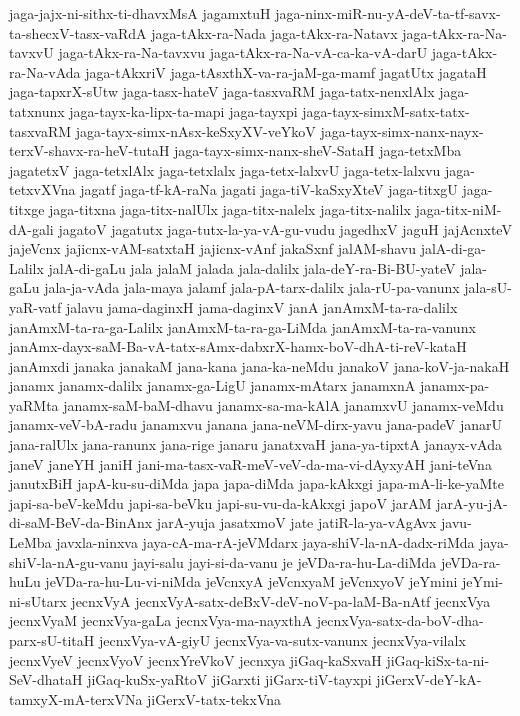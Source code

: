 {jaga-jajx-ni-sithx-ti-dhavxMsA
jagamxtuH
jaga-ninx-miR-nu-yA-deV-ta-tf-savx-ta-shecxV-tasx-vaRdA
jaga-tAkx-ra-Nada
jaga-tAkx-ra-Natavx
jaga-tAkx-ra-Na-tavxvU
jaga-tAkx-ra-Na-tavxvu
jaga-tAkx-ra-Na-vA-ca-ka-vA-darU
jaga-tAkx-ra-Na-vAda
jaga-tAkxriV
jaga-tAsxthX-va-ra-jaM-ga-mamf
jagatUtx
jagataH
jaga-tapxrX-sUtw
jaga-tasx-hateV
jaga-tasxvaRM
jaga-tatx-nenxlAlx
jaga-tatxnunx
jaga-tayx-ka-lipx-ta-mapi
jaga-tayxpi
jaga-tayx-simxM-satx-tatx-tasxvaRM
jaga-tayx-simx-nAsx-keSxyXV-veYkoV
jaga-tayx-simx-nanx-nayx-terxV-shavx-ra-heV-tutaH
jaga-tayx-simx-nanx-sheV-SataH
jaga-tetxMba
jagatetxV
jaga-tetxlAlx
jaga-tetxlalx
jaga-tetx-lalxvU
jaga-tetx-lalxvu
jaga-tetxvXVna
jagatf
jaga-tf-kA-raNa
jagati
jaga-tiV-kaSxyXteV
jaga-titxgU
jaga-titxge
jaga-titxna
jaga-titx-nalUlx
jaga-titx-nalelx
jaga-titx-nalilx
jaga-titx-niM-dA-gali
jagatoV
jagatutx
jaga-tutx-la-ya-vA-gu-vudu
jagedhxV
jaguH
jajAcnxteV
jajeVcnx
jajicnx-vAM-satxtaH
jajicnx-vAnf
jakaSxnf
jalAM-shavu
jalA-di-ga-Lalilx
jalA-di-gaLu
jala
jalaM
jalada
jala-dalilx
jala-deY-ra-Bi-BU-yateV
jala-gaLu
jala-ja-vAda
jala-maya
jalamf
jala-pA-tarx-dalilx
jala-rU-pa-vanunx
jala-sU-yaR-vatf
jalavu
jama-daginxH
jama-daginxV
janA
janAmxM-ta-ra-dalilx
janAmxM-ta-ra-ga-Lalilx
janAmxM-ta-ra-ga-LiMda
janAmxM-ta-ra-vanunx
janAmx-dayx-saM-Ba-vA-tatx-sAmx-dabxrX-hamx-boV-dhA-ti-reV-kataH
janAmxdi
janaka
janakaM
jana-kana
jana-ka-neMdu
janakoV
jana-koV-ja-nakaH
janamx
janamx-dalilx
janamx-ga-LigU
janamx-mAtarx
janamxnA
janamx-pa-yaRMta
janamx-saM-baM-dhavu
janamx-sa-ma-kAlA
janamxvU
janamx-veMdu
janamx-veV-bA-radu
janamxvu
janana
jana-neVM-dirx-yavu
jana-padeV
janarU
jana-ralUlx
jana-ranunx
jana-rige
janaru
janatxvaH
jana-ya-tipxtA
janayx-vAda
janeV
janeYH
janiH
jani-ma-tasx-vaR-meV-veV-da-ma-vi-dAyxyAH
jani-teVna
janutxBiH
japA-ku-su-diMda
japa
japa-diMda
japa-kAkxgi
japa-mA-li-ke-yaMte
japi-sa-beV-keMdu
japi-sa-beVku
japi-su-vu-da-kAkxgi
japoV
jarAM
jarA-yu-jA-di-saM-BeV-da-BinAnx
jarA-yuja
jasatxmoV
jate
jatiR-la-ya-vAgAvx
javu-LeMba
javxla-ninxva
jaya-cA-ma-rA-jeVMdarx
jaya-shiV-la-nA-dadx-riMda
jaya-shiV-la-nA-gu-vanu
jayi-salu
jayi-si-da-vanu
je
jeVDa-ra-hu-La-diMda
jeVDa-ra-huLu
jeVDa-ra-hu-Lu-vi-niMda
jeVcnxyA
jeVcnxyaM
jeVcnxyoV
jeYmini
jeYmi-ni-sUtarx
jecnxVyA
jecnxVyA-satx-deBxV-deV-noV-pa-laM-Ba-nAtf
jecnxVya
jecnxVyaM
jecnxVya-gaLa
jecnxVya-ma-nayxthA
jecnxVya-satx-da-boV-dha-parx-sU-titaH
jecnxVya-vA-giyU
jecnxVya-va-sutx-vanunx
jecnxVya-vilalx
jecnxVyeV
jecnxVyoV
jecnxYreVkoV
jecnxya
jiGaq-kaSxvaH
jiGaq-kiSx-ta-ni-SeV-dhataH
jiGaq-kuSx-yaRtoV
jiGarxti
jiGarx-tiV-tayxpi
jiGerxV-deY-kA-tamxyX-mA-terxVNa
jiGerxV-tatx-tekxVna
}
